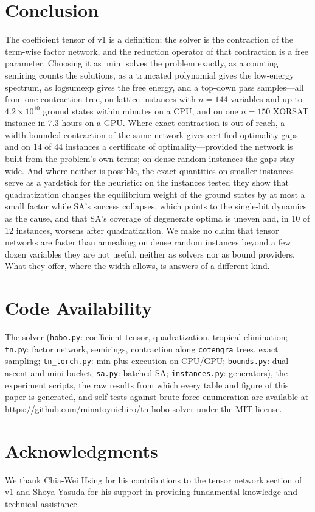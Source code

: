 \documentclass{article}
\begin{document}
\section{Conclusion}
\label{sec:conclusion}

The coefficient tensor of v1 is a definition; the solver is the contraction of the term-wise factor network, and the reduction operator of that contraction is a free parameter. Choosing it as $\min$ solves the problem exactly, as a counting semiring counts the solutions, as a truncated polynomial gives the low-energy spectrum, as $\mathrm{logsumexp}$ gives the free energy, and a top-down pass samples---all from one contraction tree, on lattice instances with $n=144$ variables and up to $4.2\times10^{10}$ ground states within minutes on a CPU, and on one $n=150$ XORSAT instance in 7.3 hours on a GPU. Where exact contraction is out of reach, a width-bounded contraction of the same network gives certified optimality gaps---and on 14 of 44 instances a certificate of optimality---provided the network is built from the problem's own terms; on dense random instances the gaps stay wide. And where neither is possible, the exact quantities on smaller instances serve as a yardstick for the heuristic: on the instances tested they show that quadratization changes the equilibrium weight of the ground states by at most a small factor while SA's success collapses, which points to the single-bit dynamics as the cause, and that SA's coverage of degenerate optima is uneven and, in 10 of 12 instances, worsens after quadratization. We make no claim that tensor networks are faster than annealing; on dense random instances beyond a few dozen variables they are not useful, neither as solvers nor as bound providers. What they offer, where the width allows, is answers of a different kind.

\section*{Code Availability}
\label{sec:code}
The solver (\texttt{hobo.py}: coefficient tensor, quadratization, tropical elimination; \texttt{tn.py}: factor network, semirings, contraction along \texttt{cotengra} trees, exact sampling; \texttt{tn\_torch.py}: min-plus execution on CPU/GPU; \texttt{bounds.py}: dual ascent and mini-bucket; \texttt{sa.py}: batched SA; \texttt{instances.py}: generators), the experiment scripts, the raw results from which every table and figure of this paper is generated, and self-tests against brute-force enumeration are available at \url{https://github.com/minatoyuichiro/tn-hobo-solver} under the MIT license.

\section*{Acknowledgments}
We thank Chia-Wei Hsing for his contributions to the tensor network section of v1 and Shoya Yasuda for his support in providing fundamental knowledge and technical assistance.



\end{document}
